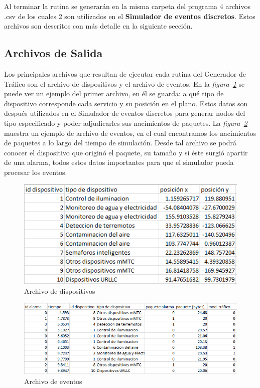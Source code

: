 \hfill

\break

Al terminar la rutina se generarán en la misma carpeta del programa 4 archivos .csv de los cuales 2 son utilizados en el \textbf{Simulador de eventos discretos}. Estos archivos son descritos con más detalle en la siguiente sección. \newline

\subsection{Archivos de Salida}

Los principales archivos que resultan de ejecutar cada rutina del Generador de Tráfico son el archivo de dispositivos y el archivo de eventos. En la \textit{figura~\ref{fig:archivodispositivos}} se puede ver un ejemplo del primer archivo, en él se guarda: a qué tipo de dispositivo corresponde cada servicio y su posición en el plano. Estos datos son después utilizados en el Simulador de eventos discretos para generar nodos del tipo especificado y poder adjudicarles sus nacimientos de paquetes. La \textit{figura~\ref{fig:archivoeventos}} muestra un ejemplo de archivo de eventos, en el cual encontramos los nacimientos de paquetes a lo largo del tiempo de simulación. Desde tal archivo se podrá conocer el dispositivo que originó el paquete, su tamaño y si éste surgió apartir de una alarma, todos estos datos importantes para que el simulador pueda procesar los eventos.  \newline

\begin{figure}[th]
    \centering
    \includegraphics[scale=.75]{Figures/disparchivo.png}
    \decoRule
    \caption[Archivo de dispositivos]{Archivo de dispositivos}
    \label{fig:archivodispositivos}
\end{figure}

\begin{figure}[th]
    \centering
    \includegraphics[scale=.75]{Figures/eventosarchivo.png}
    \decoRule
    \caption[Archivo de eventos]{Archivo de eventos}
    \label{fig:archivoeventos}
\end{figure}

